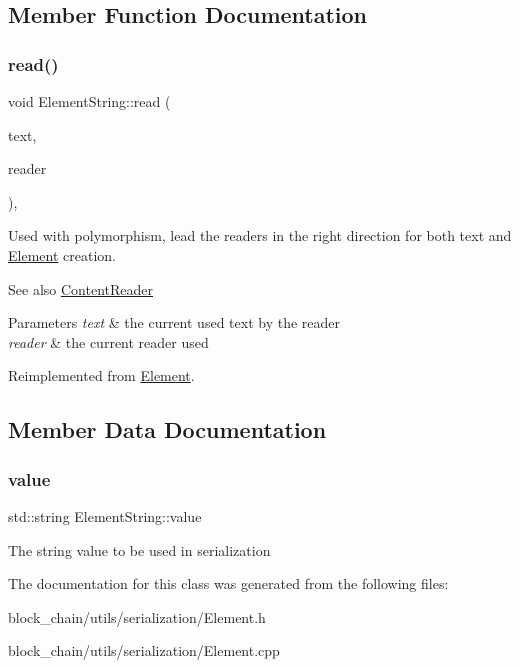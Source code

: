 \subsection{Member Function Documentation}
\mbox{\label{classElementString_a781fe545117610d945772b240f24ac44}} 
\subsubsection{\texorpdfstring{read()}{read()}}
{\footnotesize\ttfamily void Element\+String\+::read (\begin{DoxyParamCaption}\item[{std\+::string \&}]{text,  }\item[{const \mbox{\hyperlink{classContentReader}{Content\+Reader}} $\ast$}]{reader }\end{DoxyParamCaption})\hspace{0.3cm}{\ttfamily [override]}, {\ttfamily [virtual]}}

Used with polymorphism, lead the readers in the right direction for both text and \mbox{\hyperlink{classElement}{Element}} creation. \begin{DoxySeeAlso}{See also}
\mbox{\hyperlink{classContentReader}{Content\+Reader}}
\end{DoxySeeAlso}

\begin{DoxyParams}{Parameters}
{\em text} & the current used text by the reader \\
\hline
{\em reader} & the current reader used \\
\hline
\end{DoxyParams}


Reimplemented from \mbox{\hyperlink{classElement_ab468bd37a9558f5227837a9236bc9e4b}{Element}}.



\subsection{Member Data Documentation}
\mbox{\label{classElementString_a755b6d208dcea9d496da60102e8f0f81}} 
\subsubsection{\texorpdfstring{value}{value}}
{\footnotesize\ttfamily std\+::string Element\+String\+::value}

The string value to be used in serialization 

The documentation for this class was generated from the following files\+:\begin{DoxyCompactItemize}
\item 
block\+\_\+chain/utils/serialization/Element.\+h\item 
block\+\_\+chain/utils/serialization/Element.\+cpp\end{DoxyCompactItemize}
